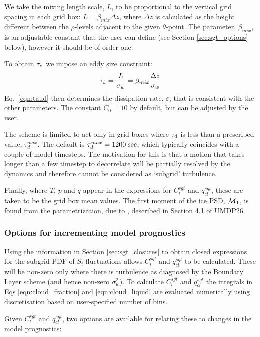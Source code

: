 \documentclass{UMDP_article}
\begin{document}
We take the mixing length scale, $L$, to be proportional to the vertical
grid spacing in each grid box: $L=\beta_{mix} \Delta z$, where $\Delta z$ is
calculated as the height different between the $\rho$-levels adjacent
to the given $\theta$-point. The parameter, $\beta_{mix}$,
is an adjustable constant that the user can define (see Section \ref{sec:sgt_options} below),
however it should be of order one.

To obtain $\tau_{\rm d}$ we impose an eddy size constraint:
\begin{equation}
 \tau_{\rm d} = \frac{L}{\sigma_w} = \beta_{mix} \frac{\Delta z}{\sigma_w}
\label{eqn:eddy_size}
\end{equation}
Eq.~\ref{eqn:taud} then determines the dissipation rate, $\varepsilon$, that is consistent
with the other parameters. The constant $C_0=10$ by default, but can be adjusted by the user.

The scheme is limited to act only in grid boxes where $\tau_{\rm d}$ is less than a
prescribed value, $\tau_{d}^{max}$. The default is $\tau_d^{max}=1200\;{\rm sec}$, which typically
coincides with a couple of model timesteps. The motivation for this is that a
motion that takes longer than a few timestep to decorrelate will be partially resolved by
the dynamics and therefore cannot be considered as `subgrid' turbulence.

Finally, where $T$, $p$ and $q$ appear in the expressions for $C_l^{sgt}$ and $q_{cl}^{sgt}$,
these are taken to be the grid box mean values. The first moment of the ice PSD, ${\cal M}_1$,
is found from the parametrization, due to \cite{fhbicc05}, described
in Section 4.1 of UMDP26.


\subsubsection{Options for incrementing model prognostics}\label{sec:sgt_increments}

Using the information in Section \ref{sec:sgt_closures} to obtain closed expressions
for the subgrid PDF of $S_i$-fluctuations allows $C_l^{sgt}$ and $q_{cl}^{sgt}$ to be
calculated. These will be non-zero only where there is turbulence as diagnosed by the
Boundary Layer scheme (and hence non-zero $\sigma_w^2$). To calculate $C_l^{sgt}$ and $q_{cl}^{sgt}$
the integrals in Eqs \ref{eqn:cloud_fraction} and \ref{eqn:cloud_liquid} are evaluated
numerically using discretisation based on user-specified number of bins.

Given $C_l^{sgt}$ and $q_{cl}^{sgt}$, two options are available for relating these
to changes in the model prognostics:
\end{document}
